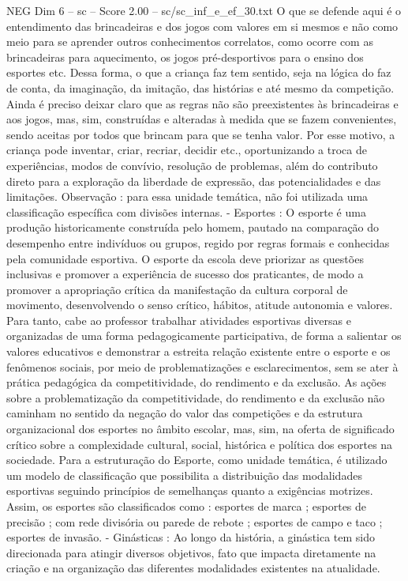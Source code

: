 \begin{textsample}{NEG Dim 6 – sc – Score 2.00 – sc/sc\_inf\_e\_ef\_30.txt}
O que se defende aqui é o entendimento das brincadeiras e dos jogos com valores em si mesmos e não como meio para se aprender outros conhecimentos correlatos, como ocorre com as brincadeiras para aquecimento, os jogos pré-desportivos para o ensino dos esportes etc.
Dessa forma, o que a criança faz tem sentido, seja na lógica do faz de conta, da imaginação, da imitação, das histórias e até mesmo da competição.
Ainda é preciso deixar claro que as regras não são preexistentes às brincadeiras e aos jogos, mas, sim, construídas e alteradas à medida que se fazem convenientes, sendo aceitas por todos que brincam para que se tenha valor.
Por esse motivo, a criança pode inventar, criar, recriar, decidir etc., oportunizando a troca de experiências, modos de convívio, resolução de problemas, além do contributo direto para a exploração da liberdade de expressão, das potencialidades e das limitações.
Observação : para essa unidade temática, não foi utilizada uma classificação específica com divisões internas. - Esportes : O esporte é uma produção historicamente construída pelo homem, pautado na comparação do desempenho entre indivíduos ou grupos, regido por regras formais e conhecidas pela comunidade esportiva.
O esporte da escola deve priorizar as questões inclusivas e promover a experiência de sucesso dos praticantes, de modo a promover a apropriação crítica da manifestação da cultura corporal de movimento, desenvolvendo o senso crítico, hábitos, atitude autonomia e valores.
Para tanto, cabe ao professor trabalhar atividades esportivas diversas e organizadas de uma forma pedagogicamente participativa, de forma a salientar os valores educativos e demonstrar a estreita relação existente entre o esporte e os fenômenos sociais, por meio de problematizações e esclarecimentos, sem se ater à prática pedagógica da competitividade, do rendimento e da exclusão.
As ações sobre a problematização da competitividade, do rendimento e da exclusão não caminham no sentido da negação do valor das competições e da estrutura organizacional dos esportes no âmbito escolar, mas, sim, na oferta de significado crítico sobre a complexidade cultural, social, histórica e política dos esportes na sociedade.
Para a estruturação do Esporte, como unidade temática, é utilizado um modelo de classificação que possibilita a distribuição das modalidades esportivas seguindo princípios de semelhanças quanto a exigências motrizes.
Assim, os esportes são classificados como : esportes de marca ; esportes de precisão ; com rede divisória ou parede de rebote ; esportes de campo e taco ; esportes de invasão. - Ginásticas : Ao longo da história, a ginástica tem sido direcionada para atingir diversos objetivos, fato que impacta diretamente na criação e na organização das diferentes modalidades existentes na atualidade.

\end{textsample}
